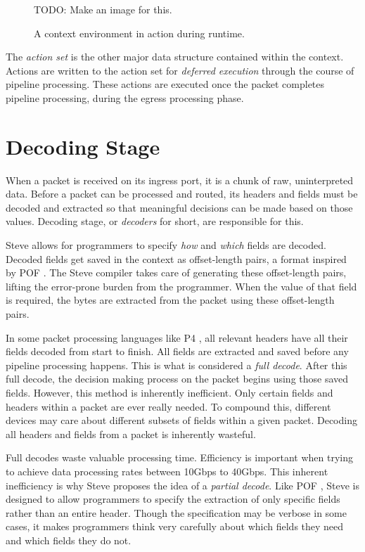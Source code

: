 \begin{figure} TODO: Make an image for this. \caption{A context environment in
action during runtime.} \label{fg:ContextEnvWorking} \end{figure}

The \textit{action set} is the other major data structure contained within the
context. Actions are written to the action set for \textit{deferred execution}
through the course of pipeline processing. These actions are executed once the
packet completes pipeline processing, during the egress processing phase.

\section{Decoding Stage} \label{decoder_desc}

When a packet is received on its ingress port, it is a chunk of raw,
uninterpreted data. Before a packet can be processed and routed, its headers and
fields must be decoded and extracted so that meaningful decisions can be made
based on those values. Decoding stage, or \textit{decoders} for short, are
responsible for this.

Steve allows for programmers to specify \textit{how} and \textit{which} fields
are decoded. Decoded fields get saved in the context as offset-length pairs, a
format inspired by POF \cite{pof, pof_fis, pof_impl}. The Steve compiler takes
care of generating these offset-length pairs, lifting the error-prone burden
from the programmer. When the value of that field is required, the bytes are
extracted from the packet using these offset-length pairs.

In some packet processing languages like P4 \cite{p4_spec, p4_spec2}, all
relevant headers have all their fields decoded from start to finish. All fields
are extracted and saved before any pipeline processing happens. This is what is
considered a \textit{full decode}. After this full decode, the decision making
process on the packet begins using those saved fields. However, this method is
inherently inefficient. Only certain fields and headers within a packet are ever
really needed. To compound this, different devices may care about different
subsets of fields within a given packet. Decoding all headers and fields from a
packet is inherently wasteful.

Full decodes waste valuable processing time. Efficiency is important when trying
to achieve data processing rates  between 10Gbps to 40Gbps. This inherent
inefficiency is why Steve proposes the idea of a \textit{partial decode}. Like
POF \cite{pof, pof_fis, pof_impl}, Steve is designed to allow programmers to
specify the extraction of only specific fields rather than an entire header.
Though the specification may be verbose in some cases, it makes programmers
think very carefully about which fields they need and which fields they do not.

